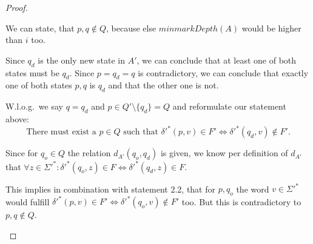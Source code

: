 \documentclass[a4paper, oneside, 11pt]{report}
\newtheorem{lemma}{Lemma}
\theoremstyle{definition}
\theoremstyle{remark}
\begin{document}
\begin{proof}
\begin{description}
		We can state, that $p, q \notin Q$, because else $minmarkDepth(A)$ would be higher than $i$ too. 
		
		Since $q_d$ is the only new state in $A'$, we can conclude that at least one of both states must be $q_d$. Since $p = q_d = q$ is contradictory, we can conclude that exactly one of both states $p, q$ is $q_d$ and that the other one is not.
		
		W.l.o.g.\ we say $q = q_d$ and $p \in Q' \setminus \{q_d\} = Q$ and reformulate our statement above:
		\begin{equation}
		\text{There must exist a }p \in Q\text{ such that }\delta'^*(p,v) \in F' \Leftrightarrow \delta'^*(q_d,v) \notin F'.
		\end{equation}
		
		
		Since for $q_o \in Q$ the relation $d_{A'}(q_o, q_d)$ is given, we know per definition of $d_{A'}$ that $\forall z\in\Sigma'^*\colon \delta'^*(q_o,z) \in F \Leftrightarrow \delta'^*(q_d,z) \in F$.
		
		This implies in combination with statement 2.2, that for $p,q_o$ the word $v\in\Sigma'^*$ would fulfill $\delta'^*(p,v) \in F' \Leftrightarrow \delta'^*(q_o,v) \notin F'$ too. But this is contradictory to $p,q \notin Q$.
		
	\end{description}
\end{proof}

%
\end{document}
